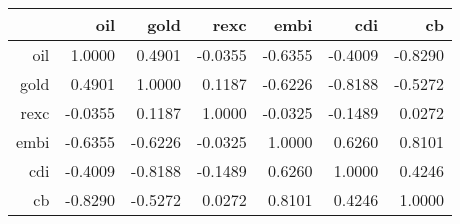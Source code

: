 \begin{table}[ht]
\centering
\begin{tabular}{rrrrrrr}
  \hline
 & oil & gold & rexc & embi & cdi & cb \\ 
  \hline
oil & 1.0000 & 0.4901 & -0.0355 & -0.6355 & -0.4009 & -0.8290 \\ 
  gold & 0.4901 & 1.0000 & 0.1187 & -0.6226 & -0.8188 & -0.5272 \\ 
  rexc & -0.0355 & 0.1187 & 1.0000 & -0.0325 & -0.1489 & 0.0272 \\ 
  embi & -0.6355 & -0.6226 & -0.0325 & 1.0000 & 0.6260 & 0.8101 \\ 
  cdi & -0.4009 & -0.8188 & -0.1489 & 0.6260 & 1.0000 & 0.4246 \\ 
  cb & -0.8290 & -0.5272 & 0.0272 & 0.8101 & 0.4246 & 1.0000 \\ 
   \hline
\end{tabular}
\end{table}
